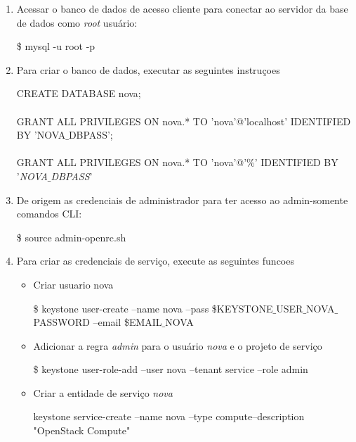 \begin{enumerate}
		\item Acessar o banco de dados de acesso cliente para conectar ao servidor da base de dados como \emph{root} usuário:
		\begin{snugshade}
			\$ mysql -u root -p
		\end{snugshade}
	
		\item Para criar o banco de dados, executar as seguintes instruçoes
		\begin{snugshade}
			CREATE DATABASE nova; \\ \\
			GRANT ALL PRIVILEGES ON nova.* TO 'nova'@'localhost' IDENTIFIED BY 'NOVA$\_$DBPASS'; \\ \\
			GRANT ALL PRIVILEGES ON nova.* TO 'nova'@'\%' IDENTIFIED BY '\emph{NOVA$\_$DBPASS}'
			\end{snugshade}
			
		\item De origem as credenciais de administrador para ter acesso ao admin-somente comandos CLI:
		\begin{snugshade}	
			\$ source admin-openrc.sh
		\end{snugshade}	
		
		\item Para criar as credenciais de serviço, execute as seguintes funcoes
		\begin{itemize}
			\item Criar usuario nova
				\begin{snugshade}	
					\$ 	keystone user-create --name nova --pass \$KEYSTONE$\_$USER$\_$NOVA$\_$PASSWORD --email \$EMAIL$\_$NOVA
				\end{snugshade}	
	
	
			\item Adicionar a regra \emph{admin}	para o usuário \emph{nova} e o projeto de serviço
				\begin{snugshade}	
					\$ keystone user-role-add --user nova --tenant service --role admin
				\end{snugshade}	

			\item Criar a entidade de serviço \emph{nova}
				\begin{snugshade}
						keystone service-create --name nova --type compute--description "OpenStack Compute"
				\end{snugshade}			
			

\end{itemize}
\end{enumerate}

